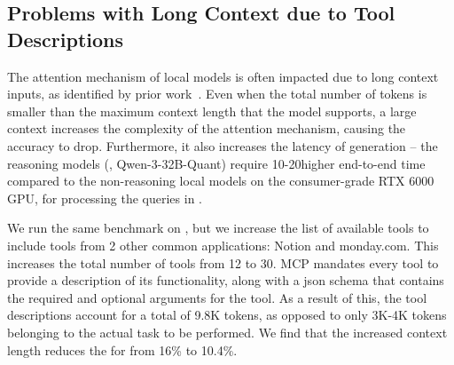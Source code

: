 \subsection{Problems with Long Context due to Tool Descriptions}

The attention mechanism of local models is often impacted due to long context inputs, as identified by prior work~\cite{liu-etal-2024-lost, qin-etal-2023-nlp}. Even when the total number of tokens is smaller than the maximum context length that the model supports, a large context increases the complexity of the attention mechanism, causing the accuracy to drop. Furthermore, it also increases the latency of generation -- the reasoning models (\qwenthreeeightb{}, Qwen-3-32B-Quant) require 10-20\myx higher end-to-end time compared to the non-reasoning local models on the consumer-grade RTX 6000 GPU, for processing the queries in \mcpbench. 

We run the same benchmark on \baselinemodel{}, but we increase the list of available tools to include tools from 2 other common applications: Notion and monday.com. This increases the total number of tools from 12 to 30. MCP mandates every tool to provide a description of its functionality, along with a json schema that contains the required and optional arguments for the tool. As a result of this, the tool descriptions account for a total of 9.8K tokens, as opposed to only 3K-4K tokens belonging to the actual task to be performed. We find that the increased context length reduces the \judgemetric{} for \basemodel{} from 16\% to 10.4\%.






